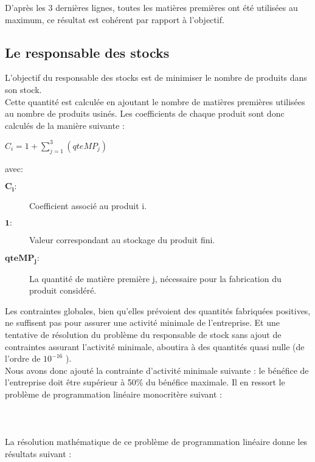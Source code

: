 \documentclass[12pt]{article}
\begin{document}
D’après les 3 dernières lignes, toutes les matières premières ont été utilisées au maximum, ce résultat est cohérent par rapport à l'objectif.

\subsection{Le responsable des stocks}
L'objectif du responsable des stocks est de minimiser le nombre de produits dans son stock. \\
Cette quantité est calculée en ajoutant le nombre de matières premières utilisées au nombre de produits usinés. Les coefficients de chaque produit sont donc calculés de la manière suivante : 
\begin{center} $ C_{i} = 1 +  \sum_{j=1}^{3}(qteMP_{j}) $ \end{center} avec:
\begin{description}
\item[$\mathbf{C_{i} :}$] Coefficient associé au produit i.
\item[$\mathbf{1} :$] Valeur correspondant au stockage du produit fini.
\item[$\mathbf{qteMP_{j} :}$] La quantité de matière première j, nécessaire pour la fabrication du produit considéré.
\end{description}
Les contraintes globales, bien qu'elles prévoient des quantités fabriquées positives, ne suffisent pas pour assurer une activité minimale de l'entreprise. Et une tentative de résolution du problème du responsable de stock sans ajout de contraintes assurant l'activité minimale, aboutira à des quantités quasi nulle (de l'ordre de $ 10 ^{-16}$ ).\\
Nous avons donc ajouté la contrainte d'activité minimale suivante : le bénéfice de l'entreprise doit être supérieur à 50\% du bénéfice maximale. 
Il en ressort le problème de programmation linéaire monocritère suivant :\\
\\
\noindent{}
\\
\\
La résolution mathématique de ce problème de programmation linéaire donne les résultats suivant :\\
\end{document}
